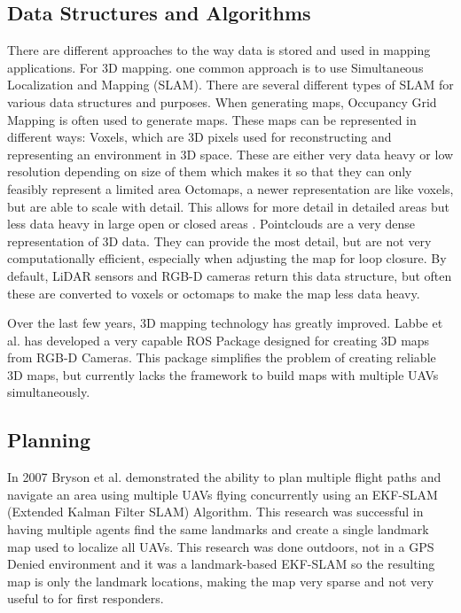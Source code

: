 \documentclass[12pt, letterpaper]{article}
\begin{document}
\subsection{Data Structures and Algorithms} 
There are different approaches to the way data is stored and used in mapping applications. For 3D mapping. one common approach is to use Simultaneous Localization and Mapping (SLAM). There are several different types of SLAM for various data structures and purposes. When generating maps, Occupancy Grid Mapping is often used to generate maps. These maps can be represented in different ways:
Voxels, which are 3D pixels used for reconstructing and representing an environment in 3D space. These are either very data heavy or low resolution depending on size of them which makes it so that they can only feasibly represent a limited area
Octomaps, a newer representation are like voxels, but are able to scale with detail. This allows for more detail in detailed areas but less data heavy in large open or closed areas \cite{Hornung2013}.
Pointclouds are a very dense representation of 3D data. They can provide the most detail, but are not very computationally efficient, especially when adjusting the map for loop closure. By default, LiDAR sensors and RGB-D cameras return this data structure, but often these are converted to voxels or octomaps to make the map less data heavy.

Over the last few years, 3D mapping technology has greatly improved. Labbe et al. \cite{Labbe2011a} \cite{Labbe2013} has developed a very capable ROS Package designed for creating 3D maps from RGB-D Cameras. This package simplifies the problem of creating reliable 3D maps, but currently lacks the framework to build maps with multiple UAVs simultaneously.

\subsection{Planning}
In 2007 Bryson et al. \cite{Bryson2007} demonstrated the ability to plan multiple flight paths and navigate an area using multiple UAVs flying concurrently using an EKF-SLAM (Extended Kalman Filter SLAM) Algorithm. This research was successful in having multiple agents find the same landmarks and create a single landmark map used to localize all UAVs. This research was done outdoors, not in a GPS Denied environment and it was a landmark-based EKF-SLAM so the resulting map is only the landmark locations, making the map very sparse and not very useful to for first responders. 
 
\end{document}

